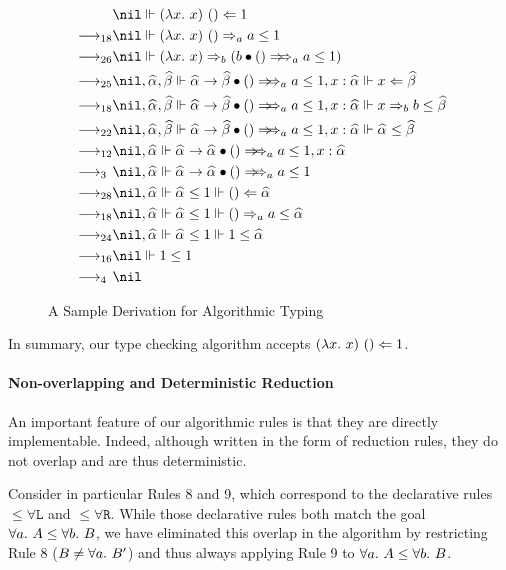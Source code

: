 \begin{figure}
\begin{gather*}
\begin{aligned}
           & \nil \Vdash (\lam x)~() \Lto 1\\
\rrule{18} & \nil \Vdash (\lam x)~() \To_a a\le 1\\
\rrule{26} & \nil \Vdash (\lam x) \To_b (\appInfAlg{b}{()}[a][a\le 1])\\
\rrule{25} & \nil,\al,\bt \Vdash \appInfAlg{\al\to\bt}{()}[a][a\le 1], x:\al \Vdash x\Lto \bt\\
\rrule{18} & \nil,\al,\bt \Vdash \appInfAlg{\al\to\bt}{()}[a][a\le 1], x:\al \Vdash x\To_b b\le \bt\\
\rrule{22} & \nil,\al,\bt \Vdash \appInfAlg{\al\to\bt}{()}[a][a\le 1], x:\al \Vdash \al\le \bt\\
\rrule{12} & \nil,\al \Vdash \appInfAlg{\al\to\al}{()}[a][a\le 1], x:\al\\
\rrule{3}  & \nil,\al \Vdash \appInfAlg{\al\to\al}{()}[a][a\le 1]\\
\rrule{28} & \nil,\al \Vdash \al\le 1 \Vdash () \Lto \al\\
\rrule{18} & \nil,\al \Vdash \al\le 1 \Vdash () \To_a a\le \al\\
\rrule{24} & \nil,\al \Vdash \al\le 1 \Vdash 1\le \al\\
\rrule{16} & \nil \Vdash 1\le 1\\
\rrule{4}  & \nil
\end{aligned}
\end{gather*}
\caption{A Sample Derivation for Algorithmic Typing}
\label{fig:alg:sample}
\end{figure}

In summary, our type checking algorithm accepts $(\lam x)~() \Lto 1$.

\paragraph{Non-overlapping and Deterministic Reduction}
An important feature of our algorithmic rules is that they are directly
implementable. Indeed, although written in the form of reduction rules, they do
not overlap and are thus deterministic.

Consider in particular Rules 8 and 9, which correspond to the declarative rules
$\mathtt{{\le}\forall L}$ and $\mathtt{{\le}\forall R}$. While those
declarative rules both match the goal $\all A\le \all[b]B$,
we have eliminated this overlap in the algorithm by restricting Rule 8
($B\neq\all B'$) and thus always applying Rule 9 to $\all A\le \all[b]B$.

